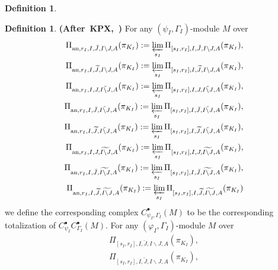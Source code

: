 \documentclass[12pt]{amsart}
\theoremstyle{definition}
\newtheorem{definition}[theorem]{Definition}
\numberwithin{equation}{section}
\begin{document}
\begin{definition}
\end{definition}






\begin{definition} \mbox{\bf{(After KPX, \cite[Definition 2.3.3]{KPX})}}
For any $(\psi_I,\Gamma_I)$-module $M$ over 
\begin{align}
\Pi_{\mathrm{an},r_I,I,\breve{J},I\backslash J,A}(\pi_{K_I}):=\varprojlim_{s_I}\Pi_{[s_I,r_I],I,\breve{J},I\backslash J,A}(\pi_{K_I}),\\	
\Pi_{\mathrm{an},r_I,I,\widetilde{J},I\backslash J,A}(\pi_{K_I}):=\varprojlim_{s_I} \Pi_{[s_I,r_I],I,\widetilde{J},I\backslash J,A}(\pi_{K_I}),\\
\Pi_{\mathrm{an},r_I,I,J,\breve{I\backslash J},A}(\pi_{K_I}):=\varprojlim_{s_I}\Pi_{[s_I,r_I],I,J,\breve{I\backslash J},A}(\pi_{K_I}),\\	
\Pi_{\mathrm{an},r_I,I,\breve{J},\breve{I\backslash J},A}(\pi_{K_I}):=\varprojlim_{s_I} \Pi_{[s_I,r_I],I,\breve{J},\breve{I\backslash J},A}(\pi_{K_I}),\\	
\Pi_{\mathrm{an},r_I,I,\widetilde{J},\breve{I\backslash J},A}(\pi_{K_I}):=\varprojlim_{s_I} \Pi_{[s_I,r_I],I,\widetilde{J},\breve{I\backslash J},A}(\pi_{K_I}),\\
\Pi_{\mathrm{an},r_I,I,J,\widetilde{I\backslash J},A}(\pi_{K_I}):=\varprojlim_{s_I} \Pi_{[s_I,r_I],I,J,\widetilde{I\backslash J},A}(\pi_{K_I}),\\	
\Pi_{\mathrm{an},r_I,I,\breve{J},\widetilde{I\backslash J},A}(\pi_{K_I}):=\varprojlim_{s_I} \Pi_{[s_I,r_I],I,\breve{J},\widetilde{I\backslash J},A}(\pi_{K_I}),\\	
\Pi_{\mathrm{an},r_I,I,\widetilde{J},\widetilde{I\backslash J},A}(\pi_{K_I}):=\varprojlim_{s_I} \Pi_{[s_I,r_I],I,\widetilde{J},\widetilde{I\backslash J},A}(\pi_{K_I})	
\end{align} 
we define the corresponding complex $C^\bullet_{\psi_I,\Gamma_I}(M)$ to be the corresponding totalization of $C^\bullet_{\psi_I}C^\bullet_{\Gamma_I}(M)$.
For any $(\varphi_I,\Gamma_I)$-module $M$ over 
\begin{align}
\Pi_{[s_I,r_I],I,\breve{J},I\backslash J,A}(\pi_{K_I}),\\	
\Pi_{[s_I,r_I],I,\widetilde{J},I\backslash J,A}(\pi_{K_I}),\\

\end{align}
\end{definition}
\end{document}
